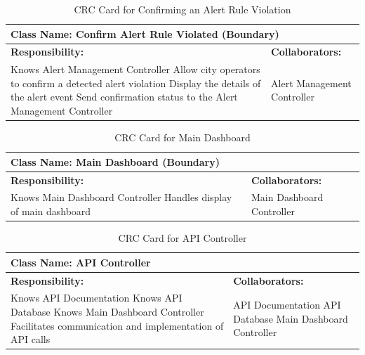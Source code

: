 \documentclass[]{article}
\begin{document}
\begin{table}[H]
    \centering
    \caption{CRC Card for Confirming an Alert Rule Violation}
    \vspace{1mm}
    \begin{tabular}{|p{7.5cm}|p{7.5cm}|}
    \hline 
      \multicolumn{2}{|l|}{\textbf{Class Name: Confirm Alert Rule Violated (Boundary)}} \\
    \hline
    \textbf{Responsibility:} & \textbf{Collaborators:} \\
    \hline
		Knows Alert Management Controller \newline
        Allow city operators to confirm a detected alert violation \newline
        Display the details of the alert event \newline
        Send confirmation status to the Alert Management Controller \newline
        & 
        Alert Management Controller \\
    \hline
    \end{tabular}
\end{table}
\begin{table}[H]
    \centering
    \caption{CRC Card for Main Dashboard}
    \vspace{1mm}
    \begin{tabular}{|p{7.5cm}|p{7.5cm}|}
    \hline 
      \multicolumn{2}{|l|}{\textbf{Class Name: Main Dashboard (Boundary)}} \\
    \hline
    \textbf{Responsibility:} & \textbf{Collaborators:} \\
    \hline
        Knows Main Dashboard Controller \newline
        Handles display of main dashboard \newline
        & 
        Main Dashboard Controller \\
    \hline
    \end{tabular}
\end{table}
\begin{table}[H]
    \centering
    \caption{CRC Card for API Controller}
    \vspace{1mm}
    \begin{tabular}{|p{7.5cm}|p{7.5cm}|}
    \hline 
      \multicolumn{2}{|l|}{\textbf{Class Name: API Controller}} \\
    \hline
    \textbf{Responsibility:} & \textbf{Collaborators:} \\
    \hline
        Knows API Documentation \newline
        Knows API Database \newline
        Knows Main Dashboard Controller \newline
        Facilitates communication and implementation of API calls \newline
        &
        API Documentation \newline
        API Database \newline
        Main Dashboard Controller \\
    \hline
    \end{tabular}
\end{table}
\end{document}
